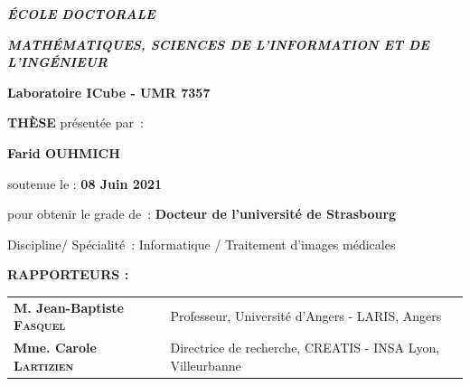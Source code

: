 \begin{titlingpage}
\vspace{1cm}

{
\centering


{\fontsize{14}{0}\selectfont \textbf{ \uppercase{\textit{\'{E}COLE DOCTORALE}}}}

\vspace{0.3cm}


{\fontsize{14}{0}\selectfont \textbf{ \uppercase{\textit{Math\'{e}matiques, Sciences de l'Information et de l'Ing\'{e}nieur}}}}

\vspace{0.5cm}

{\fontsize{16}{0}\selectfont \textbf{ Laboratoire ICube - UMR 7357}}

\vspace{1cm}

{\fontsize{22}{0}\selectfont \textbf{ \uppercase{\textsc{Th\`ese}}}} \hspace{0.2cm} {\fontsize{12}{0}\selectfont pr\'esent\'ee par~:}

\vspace{0.3cm}

{\fontsize{18}{0}\selectfont \textbf{ Farid OUHMICH}}


\vspace{1cm}


{\fontsize{18}{0}\selectfont soutenue le : \textbf{08 Juin 2021}}


{\fontsize{13}{0}\selectfont pour obtenir le grade de~: \textbf{Docteur de l'universit\'e de
Strasbourg}}

\vspace{0.4cm}

{\fontsize{12}{0}\selectfont Discipline/ Sp\'ecialit\'e~: Informatique / Traitement d'images m\'edicales}


\vspace{2cm}

{\setlength{\fboxrule}{1pt}
\fbox{\parbox[c][3.5cm]{16cm}{
\centering\fontsize{23}{0}\selectfont \textbf{{\thetitle}}}}}

\vspace{3cm}
}

{
\fontsize{12}{2}\selectfont 


\textbf{RAPPORTEURS :}\\

\hspace*{0.5cm}
\begin{tabular}{p{6cm}l}
	\textbf{M. Jean-Baptiste \textsc{Fasquel}} & Professeur, Universit\'e d'Angers - LARIS, Angers \\
	\textbf{Mme. Carole \textsc{Lartizien}} & Directrice de recherche,  CREATIS - INSA Lyon, Villeurbanne
\end{tabular}


}
\end{titlingpage}
